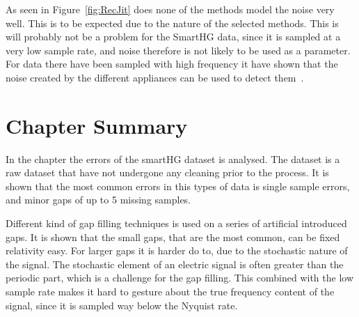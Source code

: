 As seen in Figure~\ref{fig:RecJit} does none of the methods model the noise very well. This is to be expected due to the nature of the selected methods. This is will probably not be a problem for the SmartHG data, since it is sampled at a very low sample rate, and noise therefore is not likely to be used as a parameter. For data there have been sampled with high frequency it have shown that the noise created by the different appliances can be used to detect them~\citep{RefWorks:17}. 

\section{Chapter Summary}
In the chapter the errors of the smartHG dataset is analysed. The dataset is a raw dataset that have not undergone any cleaning prior to the process. It is shown that the most common errors in this types of data is single sample errors, and minor gaps of up to 5 missing samples.  

Different kind of gap filling techniques is used on a series of artificial introduced gaps. It is shown that the small gaps, that are the most common, can be fixed relativity easy. For larger gaps it is harder do to, due to the stochastic nature of the signal. The stochastic element of an electric signal is often greater than the periodic part, which is a challenge for the gap filling. This combined with the low sample rate makes it hard to gesture about the true frequency content of the signal, since it is sampled way below the Nyquist rate. 
